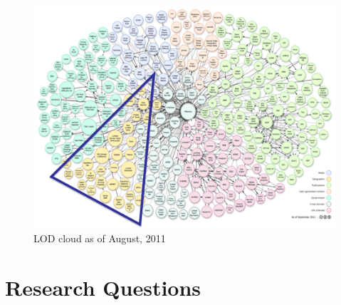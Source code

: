 \begin{figure}[ht!]
\includegraphics[scale=0.9]{img/lod-diagram-2011.png}
\caption{LOD cloud as of August, 2011}
\label{fig:lodcloud2011}
\end{figure}

\begin{figure}[ht!]
\end{figure}



\section{Research Questions}
\label{sec:questions}

